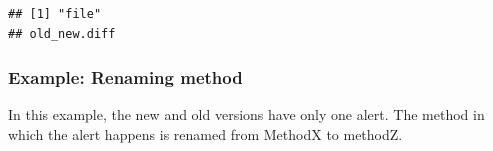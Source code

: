\documentclass[
]{article}
\begin{document}
\normalsize

\small

\begin{verbatim}
## [1] "file"
## old_new.diff
\end{verbatim}

\normalsize

\newpage

\begin{landscape}

\subsubsection{Example: Renaming method} \label{example_rename_method}

In this example, the new and old versions have only one alert. The
method in which the alert happens is renamed from MethodX to methodZ.

\scriptsize


\end{landscape}
\end{document}
